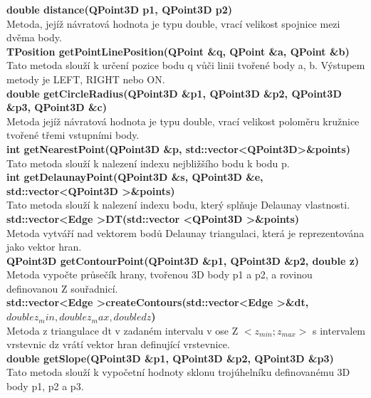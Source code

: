 \documentclass[a4paper, 12pt]{article}
\begin{document}
\textbf{double distance(QPoint3D p1, QPoint3D p2)}\\
Metoda, jejíž návratová hodnota je typu double, vrací velikost spojnice mezi dvěma body.
\\

\textbf{TPosition getPointLinePosition(QPoint \&q, QPoint \&a, QPoint \&b)}\\
Tato metoda slouží k určení pozice bodu q vůči linii tvořené body a, b. Výstupem metody je LEFT, RIGHT nebo ON.\\

\textbf{double getCircleRadius(QPoint3D \&p1, QPoint3D \&p2, QPoint3D \&p3, QPoint3D \&c)}\\
Metoda jejíž návratová hodnota je typu double, vrací velikost poloměru kružnice tvořené třemi vstupními body.\\

\textbf{int getNearestPoint(QPoint3D \&p, std::vector\textless QPoint3D\textgreater \&points)}\\
Tato metoda slouží k nalezení indexu nejbližšího bodu k bodu p.\\

\textbf{int getDelaunayPoint(QPoint3D \&s, QPoint3D \&e, std::vector\textless QPoint3D \textgreater \&points)}\\
Tato metoda slouží k nalezení indexu bodu, který splňuje Delaunay vlastnosti.\\

\textbf{std::vector\textless Edge \textgreater DT(std::vector \textless QPoint3D \textgreater \&points)}\\
Metoda vytváří nad vektorem bodů Delaunay triangulaci, která je reprezentována jako vektor hran.\\

\textbf{QPoint3D getContourPoint(QPoint3D \&p1, QPoint3D \&p2, double z)}\\
Metoda vypočte průsečík hrany, tvořenou 3D body p1 a p2, a rovinou definovanou Z souřadnicí.\\

\textbf{std::vector\textless Edge \textgreater createContours(std::vector\textless Edge \textgreater \&dt, $double z_min, double z_max, double dz$)}\\
Metoda z triangulace dt v zadaném intervalu v ose Z $<z_{min} ; z_{max}>$ s intervalem vrstevnic dz vrátí vektor hran definující vrstevnice.\\

\textbf{double getSlope(QPoint3D \&p1, QPoint3D \&p2, QPoint3D \&p3)}\\
Tato metoda slouží k vypočetní hodnoty sklonu trojúhelníku definovanému 3D body p1, p2 a p3.\\
\end{document}
